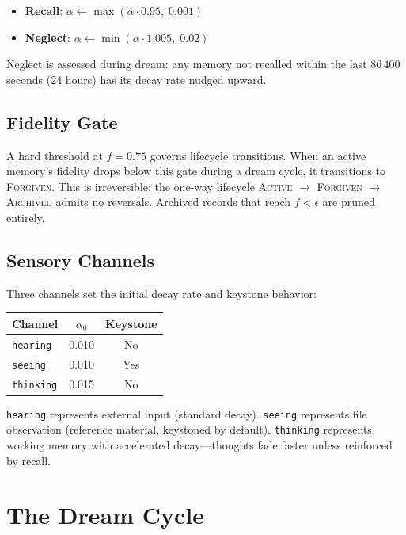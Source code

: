 \documentclass[twocolumn,10pt]{article}
\begin{document}
\begin{itemize}[leftmargin=*,itemsep=1pt]
\item \textbf{Recall}: $\alpha \leftarrow \max(\alpha \cdot 0.95,\; 0.001)$
\item \textbf{Neglect}: $\alpha \leftarrow \min(\alpha \cdot 1.005,\; 0.02)$
\end{itemize}

\noindent
Neglect is assessed during dream: any memory not recalled within the last
86\,400 seconds (24 hours) has its decay rate nudged upward.

\subsection{Fidelity Gate}

A hard threshold at $f = 0.75$ governs lifecycle transitions.  When an
active memory's fidelity drops below this gate during a dream cycle, it
transitions to \textsc{Forgiven}.  This is irreversible: the one-way
lifecycle \textsc{Active} $\to$ \textsc{Forgiven} $\to$ \textsc{Archived}
admits no reversals.  Archived records that reach $f < \epsilon$ are
pruned entirely.

\subsection{Sensory Channels}

Three channels set the initial decay rate and keystone behavior:

\begin{center}
\begin{tabular}{lcc}
\toprule
Channel & $\alpha_0$ & Keystone \\
\midrule
\texttt{hearing} & 0.010 & No \\
\texttt{seeing}  & 0.010 & Yes \\
\texttt{thinking} & 0.015 & No \\
\bottomrule
\end{tabular}
\end{center}

\noindent
\texttt{hearing} represents external input (standard decay).
\texttt{seeing} represents file observation (reference material,
keystoned by default).  \texttt{thinking} represents working memory
with accelerated decay---thoughts fade faster unless reinforced by recall.

\section{The Dream Cycle}
\end{document}
